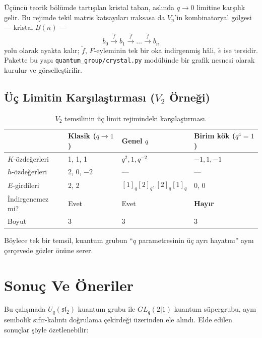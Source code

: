 \documentclass[12pt,a4paper,fleqn]{report}
\newcommand{\normalsemi}{;}
\newcommand{\normalsemi}{\begingroup\semicolonfont;\endgroup}
\numberwithin{equation}{chapter}
\theoremstyle{plain}
\theoremstyle{definition}
\renewcommand{\sl}{\mathfrak{sl}}
\newcommand{\Uq}{U_q(\sl_2)}
\newcommand{\qint}[1]{[#1]_q}
\begin{document}
Üçüncü teorik bölümde tartışılan kristal taban, aslında $q\to 0$ limitine
karşılık gelir. Bu rejimde tekil matris katsayıları ıraksasa da $V_n$'in
kombinatoryal gölgesi --- kristal $B(n)$ ---
\[
  b_0 \xrightarrow{\tilde f} b_1 \xrightarrow{\tilde f} \dots
   \xrightarrow{\tilde f} b_n
\]
yolu olarak ayakta kalır\normalsemi{} $\tilde f$, $F$-eyleminin tek bir oka indirgenmiş
hâli, $\tilde e$ ise tersidir. Pakette bu yapı \texttt{quantum\_group/crystal.py}
modülünde bir grafik nesnesi olarak kurulur ve görselleştirilir.

\section{Üç Limitin Karşılaştırması ($V_2$ Örneği)}

\begin{table}[h]
\centering
\small
\caption{$V_2$ temsilinin üç limit rejimindeki karşılaştırması.}
\label{tab:limits}
\begin{tabularx}{\textwidth}{@{}lXXX@{}}
\toprule
& Klasik ($q \to 1$) & Genel $q$ & Birim kök ($q^4 = 1$) \\
\midrule
$K$-özdeğerleri & 1, 1, 1 & $q^2, 1, q^{-2}$ & $-1, 1, -1$ \\
$h$-özdeğerleri & 2, 0, $-2$ & --- & --- \\
$E$-girdileri & 2, 2 & $\qint{1}\qint{2}, \qint{2}\qint{1}$ & 0, 0 \\
İndirgenemez mi? & Evet & Evet & \textbf{Hayır} \\
Boyut & 3 & 3 & 3 \\
\bottomrule
\end{tabularx}
\end{table}

Böylece tek bir temsil, kuantum grubun ``$q$ parametresinin üç ayrı hayatını''
aynı çerçevede gözler önüne serer.

\chapter{Sonuç Ve Öneriler}

Bu çalışmada $\Uq$ kuantum grubu ile $GL_q(2|1)$ kuantum süpergrubu, aynı
sembolik sıfır-kalıntı doğrulama çekirdeği üzerinden ele alındı. Elde edilen
sonuçlar şöyle özetlenebilir:
\end{document}
